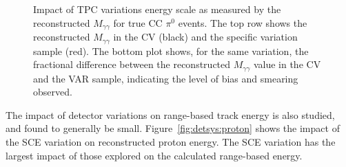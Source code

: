 \documentclass[a4paper]{article}
\begin{document}
\begin{figure}[H]
\begin{center}
\caption{\label{fig:detsys:pi0mass}Impact of TPC variations energy scale as measured by the reconstructed $M_{\gamma\gamma}$ for true CC $\pi^0$ events. The top row shows the reconstructed $M_{\gamma\gamma}$ in the CV (black) and the specific variation sample (red). The bottom plot shows, for the same variation, the fractional difference between the reconstructed $M_{\gamma\gamma}$ value in the CV and the VAR sample, indicating the level of bias and smearing observed.}
\end{center}
\end{figure}

\par The impact of detector variations on range-based track energy is also studied, and found to generally be small. Figure~\ref{fig:detsys:proton} shows the impact of the SCE variation on reconstructed proton energy. The SCE variation has the largest impact of those explored on the calculated range-based energy.
\end{document}
